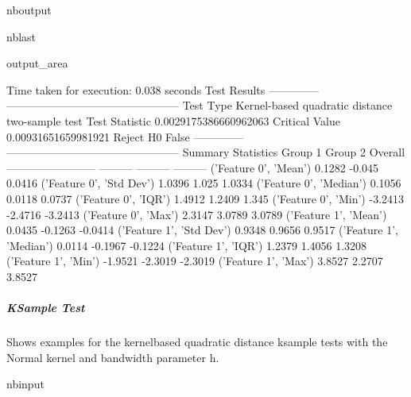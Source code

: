 \documentclass[letterpaper,10pt,english,openany,oneside]{sphinxmanual}
\begin{document}
{{{{\begin{sphinxuseclass}{nboutput}
\begin{sphinxuseclass}{nblast}
{\begin{sphinxuseclass}{output_area}
\begin{sphinxuseclass}{}
\begin{sphinxVerbatim}[commandchars=\\\{\}]
Time taken for execution: 0.038 seconds
Test Results
--------------  -----------------------------------------------
Test Type       Kernel-based quadratic distance two-sample test
Test Statistic  0.0029175386660962063
Critical Value  0.00931651659981921
Reject H0       False
--------------  -----------------------------------------------
Summary Statistics
                            Group 1    Group 2    Overall
------------------------  ---------  ---------  ---------
('Feature 0', 'Mean')        0.1282    -0.045      0.0416
('Feature 0', 'Std Dev')     1.0396     1.025      1.0334
('Feature 0', 'Median')      0.1056     0.0118     0.0737
('Feature 0', 'IQR')         1.4912     1.2409     1.345
('Feature 0', 'Min')        -3.2413    -2.4716    -3.2413
('Feature 0', 'Max')         2.3147     3.0789     3.0789
('Feature 1', 'Mean')        0.0435    -0.1263    -0.0414
('Feature 1', 'Std Dev')     0.9348     0.9656     0.9517
('Feature 1', 'Median')      0.0114    -0.1967    -0.1224
('Feature 1', 'IQR')         1.2379     1.4056     1.3208
('Feature 1', 'Min')        -1.9521    -2.3019    -2.3019
('Feature 1', 'Max')         3.8527     2.2707     3.8527
\end{sphinxVerbatim}



\end{sphinxuseclass}
\end{sphinxuseclass}
}

\end{sphinxuseclass}
\end{sphinxuseclass}

\subparagraph{K\sphinxhyphen{}Sample Test}
\label{\detokenize{user_guide/basic_usage:K-Sample-Test}}
\sphinxAtStartPar
Shows examples for the kernel\sphinxhyphen{}based quadratic distance k\sphinxhyphen{}sample tests with the Normal kernel and bandwidth parameter h.

\begin{sphinxuseclass}{nbinput}
{
\begin{sphinxVerbatim}[commandchars=\\\{\}]
\llap{\color{nbsphinxin}[9]:\,\hspace{\fboxrule}\hspace{\fboxsep}}   

   
    


\end{sphinxVerbatim}}
\end{sphinxuseclass}}}}}
\end{document}
